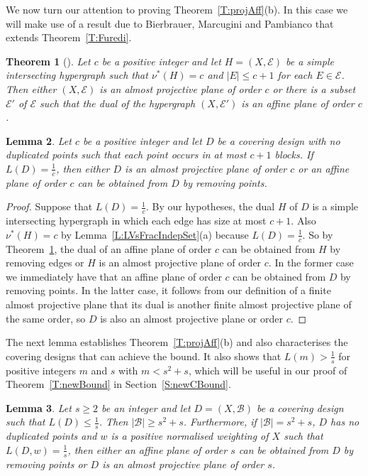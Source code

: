 \documentclass[11pt]{article}
\newtheorem{Theorem}{Theorem}[section]
\newtheorem{Lemma}[Theorem]{Lemma}
\theoremstyle{definition}
\renewcommand{\leq}{\leqslant}
\renewcommand{\geq}{\geqslant}
\newcommand{\B}{{\ensuremath{\mathcal{B}}}}
\newcommand{\E}{\mathcal{E}}
\begin{document}
We now turn our attention to proving Theorem~\ref{T:projAff}(b). In this case we will make use of a result due to Bierbrauer, Marcugini and Pambianco \cite[Corollary~1]{BieMarPam} that extends Theorem~\ref{T:Furedi}.

\begin{Theorem}[{\cite[Corollary~1]{BieMarPam}}]\label{T:BieMarPam}
Let $c$ be a positive integer and let $H=(X,\E)$ be a simple intersecting hypergraph such that $\nu^*(H) = c$ and $|E| \leq c+1$ for each $E \in \E$. Then either $(X,\E)$ is an almost projective plane of order $c$ or there is a subset $\E'$ of $\E$ such that the dual of the hypergraph $(X,\E')$ is an affine plane of order $c$.
\end{Theorem}

\begin{Lemma}\label{L:BieMarPamConsequence}
Let $c$ be a positive integer and let $D$ be a covering design with no duplicated points such that each point occurs in at most $c+1$ blocks. If $L(D) = \frac{1}{c}$, then either $D$ is an almost projective plane of order $c$ or an affine plane of order $c$ can be obtained from $D$ by removing points.
\end{Lemma}

\begin{proof}
Suppose that $L(D) = \frac{1}{c}$. By our hypotheses, the dual $H$ of $D$ is a simple intersecting hypergraph in which each edge has size at most $c+1$. Also $\nu^*(H)=c$ by Lemma~\ref{L:LVsFracIndepSet}(a) because $L(D) = \frac{1}{c}$. So by Theorem~\ref{T:BieMarPam}, the dual of an affine plane of order $c$ can be obtained from $H$ by removing edges or $H$ is an almost projective plane of order $c$. In the former case we immediately have that an affine plane of order $c$ can be obtained from $D$ by removing points. In the latter case, it follows from our definition of a finite almost projective plane that its dual is another finite almost projective plane of the same order, so $D$ is also an almost projective plane or order $c$.
\end{proof}


The next lemma establishes Theorem~\ref{T:projAff}(b) and also characterises the covering designs that can achieve the bound. It also shows that $L(m) > \frac{1}{s}$ for positive integers $m$ and $s$ with $m < s^2+s$, which will be useful in our proof of Theorem~\ref{T:newBound} in Section~\ref{S:newCBound}.

\begin{Lemma}\label{L:affinePlanesEtc}
Let $s \geq 2$ be an integer and let $D=(X,\B)$ be a covering design such that $L(D) \leq \frac{1}{s}$. Then $|\B| \geq s^2+s$. Furthermore, if $|\B|=s^2+s$, $D$ has no duplicated points and $w$ is a positive normalised weighting of $X$ such that $L(D,w) = \frac{1}{s}$, then either an affine plane of order $s$ can be obtained from $D$ by removing points or $D$ is an almost projective plane of order $s$.
\end{Lemma}
\end{document}
